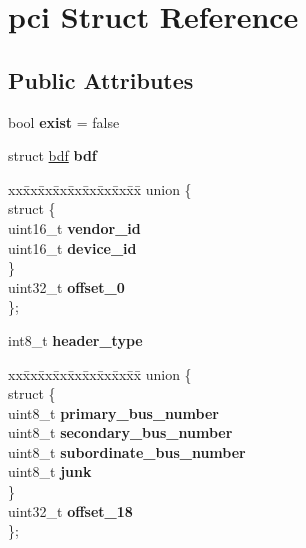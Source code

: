 \hypertarget{structpci}{}\section{pci Struct Reference}
\label{structpci}
\subsection*{Public Attributes}
\begin{DoxyCompactItemize}
\item 
\mbox{\label{structpci_a4fbf5aef85cf6f114ef2c251d1d6c589}} 
bool {\bfseries exist} = false
\item 
\mbox{\label{structpci_a7a1fb1574c140948cd9f7fae2f621e0b}} 
struct \mbox{\hyperlink{structbdf}{bdf}} {\bfseries bdf}
\item 
\mbox{\label{structpci_af70b39686d691ac28718d77909edd189}} 
\begin{tabbing}
xx\=xx\=xx\=xx\=xx\=xx\=xx\=xx\=xx\=\kill
union \{\\
\mbox{\label{unionpci_1_1_0D11_affa4816d356736545f3d9d51fafee616}} 
\>struct \{\\
\>\>uint16\_t {\bfseries vendor\_id}\\
\>\>uint16\_t {\bfseries device\_id}\\
\>\} \\
\>uint32\_t {\bfseries offset\_0}\\
\}; \\

\end{tabbing}\item 
\mbox{\label{structpci_a12b405a6b3ed7846f1e45cd06709e794}} 
int8\+\_\+t {\bfseries header\+\_\+type}
\item 
\mbox{\label{structpci_a2834e29859bf5fbad19d4a23c5aa51d8}} 
\begin{tabbing}
xx\=xx\=xx\=xx\=xx\=xx\=xx\=xx\=xx\=\kill
union \{\\
\mbox{\label{unionpci_1_1_0D13_a82f419dcc1fe1810804349324fab05ba}} 
\>struct \{\\
\>\>uint8\_t {\bfseries primary\_bus\_number}\\
\>\>uint8\_t {\bfseries secondary\_bus\_number}\\
\>\>uint8\_t {\bfseries subordinate\_bus\_number}\\
\>\>uint8\_t {\bfseries junk}\\
\>\} \\
\>uint32\_t {\bfseries offset\_18}\\
\}; \\


\end{tabbing}
\end{DoxyCompactItemize}
